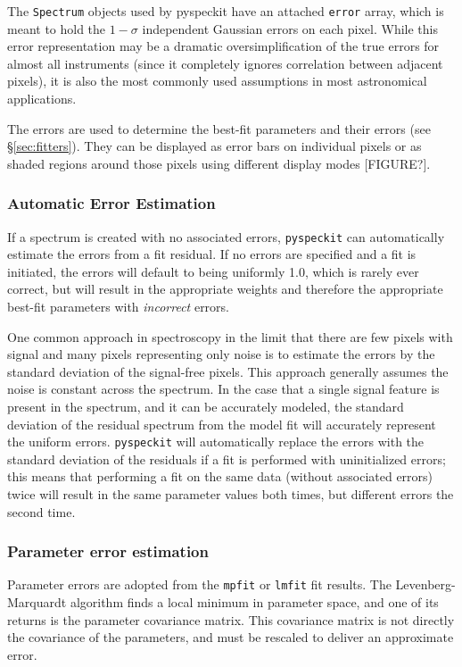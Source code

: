 \documentclass[twocolumn]{aastex61}
\newcommand{\pyspeckit}{\texttt{pyspeckit}\xspace}
\begin{document}
The \texttt{Spectrum} objects used by pyspeckit have an attached \texttt{error}
array, which is meant to hold the $1-\sigma$ independent Gaussian errors on
each pixel.  While this error representation may be a dramatic
oversimplification of the true errors for almost all instruments (since it
completely ignores correlation between adjacent pixels), it is also the most
commonly used assumptions in most astronomical applications.

The errors are used to determine the best-fit parameters and their errors (see
\S \ref{sec:fitters}).  They can be displayed as error bars on individual
pixels or as shaded regions around those pixels using different display modes
[FIGURE?].

\subsubsection{Automatic Error Estimation}
If a spectrum is created with no associated errors, \pyspeckit can automatically
estimate the errors from a fit residual.  If no errors are specified and
a fit is initiated, the errors will default to being uniformly 1.0, which
is rarely ever correct, but will result in the appropriate weights and
therefore the appropriate best-fit parameters with \emph{incorrect} errors.

One common approach in spectroscopy in the limit that there are few pixels with
signal and many pixels representing only noise is to estimate the errors by the
standard deviation of the signal-free pixels.  This approach generally assumes
the noise is constant across the spectrum.  In the case that a single signal
feature is present in the spectrum, and it can be accurately modeled, the
standard deviation of the residual spectrum from the model fit will accurately
represent the uniform errors.  \pyspeckit will automatically replace the errors
with the standard deviation of the residuals if a fit is performed with
uninitialized errors; this means that performing a fit on the same data
(without associated errors) twice will result in the same parameter values both
times, but different errors the second time.


\subsubsection{Parameter error estimation}
\label{sec:parerrest}
Parameter errors are adopted from the \texttt{mpfit} or \texttt{lmfit}
fit results.  The Levenberg-Marquardt algorithm
 finds a local minimum in parameter space,
and one of its returns is the parameter covariance matrix.  This covariance
matrix is not directly the covariance of the parameters, and must be rescaled
to deliver an approximate error.
\end{document}
